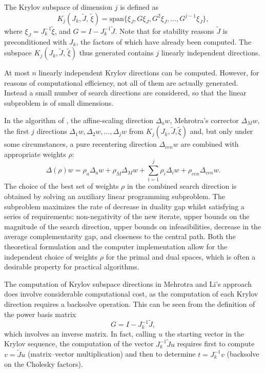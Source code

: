 The Krylov subspace of dimension $j$ is defined as
\[
K_j (J_k, \tilde J, \, \tilde \xi) =
{\mbox{span}} \{ \xi_J, G \xi_J, G^2 \xi_J, \dots,  G^{j-1} \xi_J \}, 
\]
where $\xi_J = J_k^{-1} \tilde \xi$, and $G = I - J_k^{-1} \tilde J$. 
Note that for stability reasons $\tilde J$ is preconditioned with $J_k$, 
the factors of which have already been computed.
The subspace $K_j (J_k, \tilde J, \, \tilde \xi)$
thus generated contains $j$ linearly independent directions. 

At most $n$ linearly independent Krylov directions can be
computed. However, for reasons of computational efficiency, 
not all of them are actually generated. Instead a small number
of search directions are considered, so that the linear subproblem 
is of small dimensions.

In the algorithm of \cite{MehrotraLi}, the affine-scaling
direction $\Delta_a w$, Mehrotra's corrector $\Delta_M w$, 
the first $j$ directions $\Delta_1 w, \Delta_2 w, \dots, \Delta_j w$ 
from $K_j (J_k, \tilde J, \tilde \xi)$ and, but only under some 
circumstances, a pure recentering direction $\Delta_{cen} w$ are 
combined with appropriate weights $\rho$:
\[
\Delta(\rho) w = \rho_a\Delta_a w + \rho_M\Delta_M w
               + \sum_{i=1}^j \rho_i \Delta_i w
               + \rho_{cen}\Delta_{cen} w.
\]
The choice of the best set of weights $\rho$ in the combined search 
direction is obtained by solving an auxiliary linear programming 
subproblem. The subproblem maximizes the rate of decrease 
in duality gap whilst satisfying a series of requirements:
non-negativity of the new iterate,
upper bounds on the magnitude of the search direction,
upper bounds on infeasibilities,
decrease in the average complementarity gap,
and closeness to the central path.
Both the theoretical formulation and the computer implementation 
allow for the independent choice of weights $\rho$ for the primal 
and dual spaces, which is often a desirable property for
practical algorithms.

The computation of Krylov subspace directions in Mehrotra and Li's 
approach does involve considerable computational cost, as
the computation of each Krylov direction requires a backsolve operation. 
This can be seen from the definition of the power basis matrix
\[
  G = I - J_k^{-1}\tilde J,
\]
which involves an inverse matrix. In fact, calling $u$ the starting vector 
in the Krylov sequence, the computation of the vector $ J_k^{-1}\tilde Ju$ 
requires first to compute $v = \tilde Ju$ (matrix--vector multiplication) 
and then to determine $t=J_k^{-1}v$ (backsolve on the Cholesky factors).


